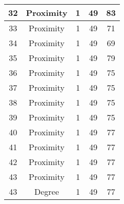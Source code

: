 \documentclass[results.tex]{subfiles}
\begin{document}
\begin{center}
\begin{tabular}{| c || c | c | c | c |}
            \hline
            32                      & Proximity                    & 1                      & 49                      & 83                   \\
            \hline
            33                      & Proximity                    & 1                      & 49                      & 71                   \\
            \hline
            34                      & Proximity                    & 1                      & 49                      & 69                   \\
            \hline
            35                      & Proximity                    & 1                      & 49                      & 79                   \\
            \hline
            36                      & Proximity                    & 1                      & 49                      & 75                   \\
            \hline
            37                      & Proximity                    & 1                      & 49                      & 75                   \\
            \hline
            38                      & Proximity                    & 1                      & 49                      & 75                   \\
            \hline
            39                      & Proximity                    & 1                      & 49                      & 75                   \\
            \hline
            40                      & Proximity                    & 1                      & 49                      & 77                   \\
            \hline
            41                      & Proximity                    & 1                      & 49                      & 77                   \\
            \hline
            42                      & Proximity                    & 1                      & 49                      & 77                   \\
            \hline
            43                      & Proximity                    & 1                      & 49                      & 77                   \\
            \hline
            43                      & Degree                       & 1                      & 49                      & 77                   \\

\end{tabular}
\end{center}
\end{document}
